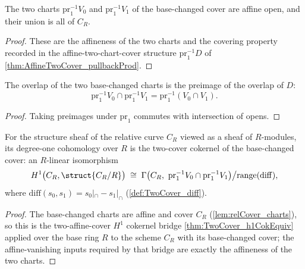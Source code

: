 \begin{lemma}
  \label{lem:relCover_charts}
  \leanok
  The two charts \(\mathrm{pr}_1^{-1} V_0\) and \(\mathrm{pr}_1^{-1} V_1\) of the base-changed cover
  are affine open, and their union is all of \(C_R\).
\end{lemma}
\begin{proof}
  \leanok
  These are the affineness of the two charts and the covering property recorded in the
  affine-two-chart-cover structure \(\mathrm{pr}_1^{-1} D\) of \ref{thm:AffineTwoCover_pullbackProd}.
\end{proof}

\begin{lemma}
  \label{lem:relCover_inf}
  \leanok
  The overlap of the two base-changed charts is the preimage of the overlap of \(D\):
  \[
    \mathrm{pr}_1^{-1} V_0 \cap \mathrm{pr}_1^{-1} V_1 = \mathrm{pr}_1^{-1}(V_0 \cap V_1).
  \]
\end{lemma}
\begin{proof}
  \leanok
  Taking preimages under \(\mathrm{pr}_1\) commutes with intersection of opens.
\end{proof}

\begin{definition}
  \label{def:relTwoCoverH1}
  \leanok
  For the structure sheaf of the relative curve \(C_R\) viewed as a sheaf of \(R\)-modules, its
  degree-one cohomology over \(R\) is the two-cover cokernel of the base-changed cover: an
  \(R\)-linear isomorphism
  \[
    H^1\bigl(C_R, \struct{C_R/R}\bigr) \;\cong\;
      \Gamma\bigl(C_R,\ \mathrm{pr}_1^{-1}V_0 \cap \mathrm{pr}_1^{-1}V_1\bigr)\big/
        \mathrm{range}(\mathrm{diff}),
  \]
  where \(\mathrm{diff}(s_0,s_1) = s_0|_\cap - s_1|_\cap\) (\ref{def:TwoCover_diff}).
\end{definition}
\begin{proof}
  \leanok
  The base-changed charts are affine and cover \(C_R\) (\ref{lem:relCover_charts}), so this is the
  two-affine-cover \(H^1\) cokernel bridge \ref{thm:TwoCover_h1CokEquiv} applied over the base ring
  \(R\) to the scheme \(C_R\) with its base-changed cover; the affine-vanishing inputs required by
  that bridge are exactly the affineness of the two charts.
\end{proof}

